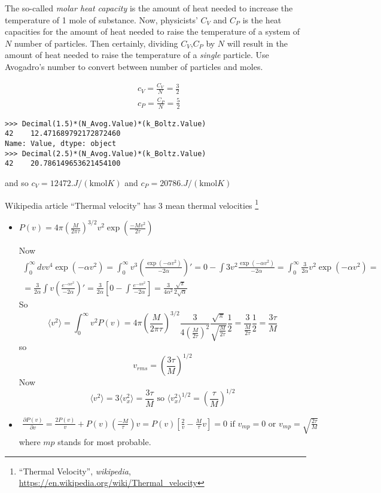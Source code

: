 \documentclass[10pt]{amsart}
\newcommand{\problemhead}[1]
  {
   \noindent{\small\bf Problem #1.}
   }
\begin{document}
\begin{multicols*}{2}
The so-called \emph{molar heat capacity} is the amount of heat needed to increase the temperature of 1 mole of substance.  Now, physicists' $C_V$ and $C_P$ is the heat capacities for the amount of heat needed to raise the temperature of a system of $N$ number of particles.  Then certainly, dividing $C_V$,$C_P$ by $N$ will result in the amount of heat needed to raise the temperature of a \emph{single} particle.  Use Avogadro's number to convert between number of particles and moles.  

\[
\begin{aligned}
  & c_V = \frac{C_V}{N} = \frac{3}{2} \\ 
  & c_P = \frac{C_P}{N} = \frac{5}{2}
\end{aligned}
\]
\begin{lstlisting}
>>> Decimal(1.5)*(N_Avog.Value)*(k_Boltz.Value)
42    12.471689792172872460
Name: Value, dtype: object
>>> Decimal(2.5)*(N_Avog.Value)*(k_Boltz.Value)
42    20.786149653621454100
\end{lstlisting}
and so $c_V = 12472. J/ ( \text{kmol} K  )$ and $c_P = 20786. J/ ( \text{kmol} K  )$


\problemhead{2: Mean thermal velocity}

Wikipedia article ``Thermal velocity'' has 3 mean thermal velocities \footnote{``Thermal Velocity'', \emph{wikipedia}, \url{https://en.wikipedia.org/wiki/Thermal_velocity}}

\begin{itemize}
  \item $P(v) = 4\pi \left( \frac{M}{2\pi \tau} \right)^{3/2} v^2 \exp{ \left( \frac{-Mv^2}{2\tau} \right) }$

Now
\[
\begin{gathered}
  \int_0^{\infty} dv v^4 \exp{ (-\alpha v^2 )} = \int_0^{\infty} v^3 \left( \frac{ \exp{ (-\alpha v^2) } }{ -2 \alpha } \right)' = 0 - \int 3v^2 \frac{ \exp{ (-\alpha v^2)} }{ -2\alpha } = \int_0^{\infty} \frac{3}{2\alpha} v^2 \exp{ (-\alpha v^2 )} = \\
  = \frac{3}{2\alpha } \int v \left( \frac{e^{-\alpha v^2 }}{ -2\alpha } \right)' = \frac{3}{2\alpha } \left[ 0 - \int \frac{e^{-\alpha v^2 } }{ -2\alpha } \right] = \frac{3}{4\alpha^2 } \frac{ \sqrt{ \pi }}{ 2\sqrt{ \alpha }}
\end{gathered}
\]
So
\[
\langle v^2 \rangle = \int_0^{\infty} v^2 P(v) = 4\pi \left( \frac{M}{2\pi \tau } \right)^{3/2} \frac{3}{4 \left( \frac{M}{2\tau} \right)^2 } \frac{ \sqrt{\pi }}{ \sqrt{ \frac{M}{2\tau} } } \frac{1}{2} = \frac{3}{ \frac{M}{2\tau} } \frac{1}{2} = \frac{3\tau }{M}
\]
so 
\[
\boxed{ v_{rms} = \left( \frac{3\tau}{M} \right)^{1/2} }
\]
Now
\[
\langle v^2 \rangle = 3\langle v_x^2 \rangle = \frac{3\tau}{M} \text{ so } \langle v_x^2 \rangle^{1/2} = \left( \frac{\tau}{M} \right)^{1/2}
\]
  \item \[
\begin{gathered}
  \frac{ \partial P(v) }{ \partial v} = \frac{2 P(v)}{v} + P(v) \left( \frac{-M}{\tau} \right)v = P(v) \left[ \frac{2}{v} - \frac{M}{\tau}v \right] = 0  \text{ if } v_{mp} = 0 \text{ or } v_{mp} = \boxed{ \sqrt{ \frac{2\tau}{M} } }
\end{gathered}
\]
where $mp$ stands for most probable.  


\end{itemize}
\end{multicols*}
\end{document}
